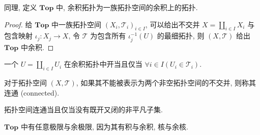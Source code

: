 \begin{definition}[余积拓扑]
    同理, 定义 \(\mathbf{Top}\) 中, 余积拓扑为一族拓扑空间的余积上的拓扑.

    \begin{proof}
        给 \(\mathbf{Top}\) 中一族拓扑空间 \({(X_i, \mathcal{T}_i)}_{i \in I}\), 可以给出不交并 \(X = \coprod_{i \in I} X_i\) 与包含映射
        \(\iota_j : X_j \to X\), 令 \(\mathcal{T}\) 为包含所有 \(\iota_j^{-1} (U)\) 的最细拓扑, 则 \((X,\mathcal{T})\) 给出 \(\mathbf{Top}\) 中余积.
    \end{proof}
\end{definition}

\begin{corollary}
    一个 \(U = \coprod_{i \in I} U_i\) 在余积拓扑中开当且仅当 \(\forall i \in I (U_i \in \mathcal{T}_i)\).
\end{corollary}

\begin{definition}[连通]
    对于拓扑空间 \((X,\mathcal{T})\), 如果其不能被表示为两个非空拓扑空间的不交并, 则称其连通 (connected).
\end{definition}

\begin{lemma}
    拓扑空间连通当且仅当没有既开又闭的非平凡子集.
\end{lemma}

\begin{lemma}
    \(\mathbf{Top}\) 中有任意极限与余极限, 因为其有积与余积, 核与余核.
\end{lemma}


